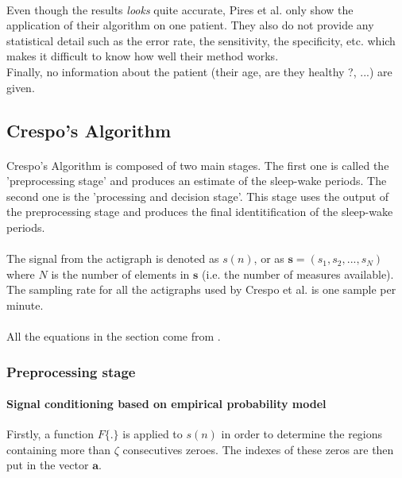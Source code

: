 \documentclass[a4paper,12pt]{article}
\begin{document}
\paragraph{}
Even though the results \textit{looks} quite accurate, Pires et al. only show the application of their algorithm on one patient. They also do not provide any statistical detail such as the error rate, the sensitivity, the specificity, etc. which makes it difficult to know how well their method works. \\
Finally, no information about the patient (their age, are they healthy ?, ...) are given.

\subsection{Crespo's Algorithm}

\paragraph{}
Crespo's Algorithm\cite{Crespo2012} is composed of two main stages. The first one is called the 'preprocessing stage' and produces an estimate of the sleep-wake periods. The second one is the 'processing and decision stage'. This stage uses the output of the preprocessing stage and produces the final identitification of the sleep-wake periods.

\paragraph{}
The signal from the actigraph is denoted as $s(n)$, or as $\mathbf{s} = (s_1, s_2, ..., s_N)$ where $N$ is the number of elements in $\mathbf{s}$ (i.e. the number of measures available). The sampling rate for all the actigraphs used by Crespo et al. is one sample per minute.

\paragraph{}
All the equations in the section come from \cite{Crespo2012}.

\subsubsection{Preprocessing stage}
\label{subsubsec:preprocessing}
\paragraph{Signal conditioning based on empirical probability model\\}
Firstly, a function $F\{.\}$ is applied to $s(n)$ in order to determine the regions containing more than $\zeta$ consecutives zeroes. The indexes of these zeros are then put in the vector $\mathbf{a}$.
\end{document}

